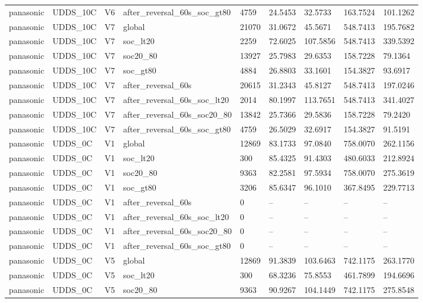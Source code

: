 \begin{tabular}{lllllllll}
panasonic & UDDS\_10C & V6 & after\_reversal\_60s\_soc\_gt80 & 4759 & 24.5453 & 32.5733 & 163.7524 & 101.1262 \\
panasonic & UDDS\_10C & V7 & global & 21070 & 31.0672 & 45.5671 & 548.7413 & 195.7682 \\
panasonic & UDDS\_10C & V7 & soc\_lt20 & 2259 & 72.6025 & 107.5856 & 548.7413 & 339.5392 \\
panasonic & UDDS\_10C & V7 & soc20\_80 & 13927 & 25.7983 & 29.6353 & 158.7228 & 79.1364 \\
panasonic & UDDS\_10C & V7 & soc\_gt80 & 4884 & 26.8803 & 33.1601 & 154.3827 & 93.6917 \\
panasonic & UDDS\_10C & V7 & after\_reversal\_60s & 20615 & 31.2343 & 45.8127 & 548.7413 & 197.0246 \\
panasonic & UDDS\_10C & V7 & after\_reversal\_60s\_soc\_lt20 & 2014 & 80.1997 & 113.7651 & 548.7413 & 341.4027 \\
panasonic & UDDS\_10C & V7 & after\_reversal\_60s\_soc20\_80 & 13842 & 25.7366 & 29.5836 & 158.7228 & 79.2420 \\
panasonic & UDDS\_10C & V7 & after\_reversal\_60s\_soc\_gt80 & 4759 & 26.5029 & 32.6917 & 154.3827 & 91.5191 \\
panasonic & UDDS\_0C & V1 & global & 12869 & 83.1733 & 97.0840 & 758.0070 & 262.1156 \\
panasonic & UDDS\_0C & V1 & soc\_lt20 & 300 & 85.4325 & 91.4303 & 480.6033 & 212.8924 \\
panasonic & UDDS\_0C & V1 & soc20\_80 & 9363 & 82.2581 & 97.5934 & 758.0070 & 275.3619 \\
panasonic & UDDS\_0C & V1 & soc\_gt80 & 3206 & 85.6347 & 96.1010 & 367.8495 & 229.7713 \\
panasonic & UDDS\_0C & V1 & after\_reversal\_60s & 0 & -- & -- & -- & -- \\
panasonic & UDDS\_0C & V1 & after\_reversal\_60s\_soc\_lt20 & 0 & -- & -- & -- & -- \\
panasonic & UDDS\_0C & V1 & after\_reversal\_60s\_soc20\_80 & 0 & -- & -- & -- & -- \\
panasonic & UDDS\_0C & V1 & after\_reversal\_60s\_soc\_gt80 & 0 & -- & -- & -- & -- \\
panasonic & UDDS\_0C & V5 & global & 12869 & 91.3839 & 103.6463 & 742.1175 & 263.1770 \\
panasonic & UDDS\_0C & V5 & soc\_lt20 & 300 & 68.3236 & 75.8553 & 461.7899 & 194.6696 \\
panasonic & UDDS\_0C & V5 & soc20\_80 & 9363 & 90.9267 & 104.1449 & 742.1175 & 275.8548 \\

\end{tabular}
